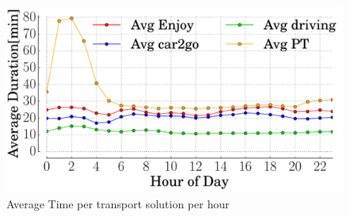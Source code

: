 \begin{figure}[h!]
\centering
 \includegraphics[width=0.85\columnwidth]{figures/average_duration.pdf}
 \caption{Average Time per transport solution per hour \label{fig:avg_comparison}}
\end{figure}

